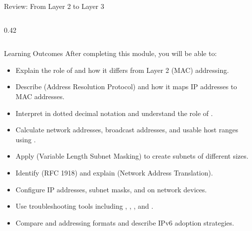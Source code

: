 \documentclass[aspectratio=169]{beamer}  %
\begin{document}
\begin{frame}{Review: From Layer 2 to Layer 3}
\begin{columns}[T]
\begin{column}{0.42\textwidth}
\begin{center}
            \end{center}
        \end{column}
    \end{columns}
\end{frame}

\begin{frame}[t,allowframebreaks]{Learning Outcomes}
    After completing this module, you will be able to:
    \vspace{0.5em}
    \begin{itemize}
        \item Explain the role of  and how it differs from Layer 2 (MAC) addressing.
        \item Describe  (Address Resolution Protocol) and how it maps IP addresses to MAC addresses.
        \item Interpret  in dotted decimal notation and understand the role of .
        \item Calculate network addresses, broadcast addresses, and usable host ranges using .
        \item Apply  (Variable Length Subnet Masking) to create subnets of different sizes.
        \item Identify  (RFC 1918) and explain  (Network Address Translation).
        \item Configure IP addresses, subnet masks, and  on network devices.
        \item Use troubleshooting tools including , , , and .
        \item Compare  and  addressing formats and describe IPv6 adoption strategies.
    \end{itemize}
\end{frame}
\end{document}

